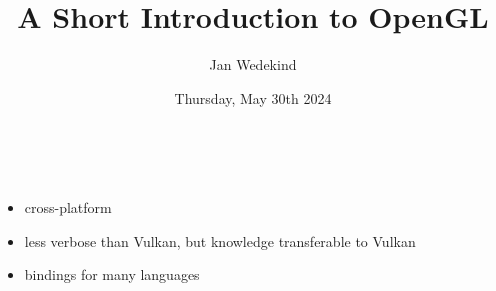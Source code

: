 \documentclass[calcdimensions,landscape,letterpaper]{powersem}
\title{A Short Introduction to OpenGL}
\author{Jan Wedekind}
\date{Thursday, May 30th 2024}
\newcommand{\thecurrentheading}{}
\newcommand{\heading}[1]{\renewcommand{\thecurrentheading}{#1}}
\begin{document}
\begin{slide}
  \heading{\ }
  \begin{center}
    \maketitle
  \end{center}
\end{slide}

\begin{slide}
  \heading{Motivation}
  \begin{center}
    \bigskip\\
    \begin{minipage}[c]{\textwidth}
      \begin{itemize}
          \item cross-platform
          \item less verbose than Vulkan, but knowledge transferable to Vulkan
          \item bindings for many languages
      \end{itemize}
    \end{minipage}
  \end{center}
\end{slide}
\end{document}
